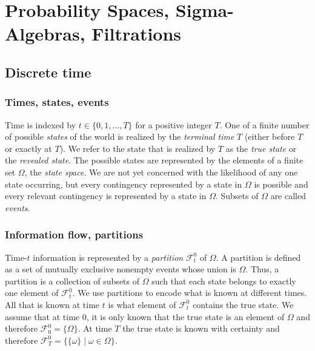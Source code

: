 \documentclass[\topdir/lecture\_notes.tex]{subfiles}
\begin{document}
\section{Probability Spaces, Sigma-Algebras, Filtrations}
\subsection{Discrete time}
\subsubsection*{Times, states, events}
Time is indexed by $t \in \{0,1, \ldots, T\}$ for a positive integer $T$. One of a finite number of possible \emph{states} of the world is realized by the \emph{terminal time} $T$ (either before $T$ or exactly at $T$). We refer to the state that is realized by $T$ as the \emph{true state} or the \emph{revealed state}. The possible states are represented by the elements of a finite set $\Omega$, the \emph{state space}. We are not yet concerned with the likelihood of any one state occurring, but every contingency represented by a state in $\Omega$ is possible and every relevant contingency is represented by a state in $\Omega$. Subsets of $\Omega$ are called \emph{events}.
\subsubsection*{Information flow, partitions}
Time-$t$ information is represented by a \emph{partition} $\mathcal{F}_{t}^{0}$ of $\Omega$. A partition is defined as a set of mutually exclusive nonempty events whose union is $\Omega$. Thus, a partition is a collection of subsets of $\Omega$ such that each state belongs to exactly one element of $\mathcal{F}_{t}^{0}$. We use partitions to encode what is known at different times. All that is known at time $t$ is what element of $\mathcal{F}_{t}^{0}$ contains the true state. We assume that at time $0$, it is only known that the true state is an element of $\Omega$ and therefore $\mathcal{F}_{0}^{0}=\{\Omega\}$. At time $T$ the true state is known with certainty and therefore $\mathcal{F}_{T}^{0}=\{\{\omega\} \mid \omega \in \Omega\}$.
\end{document}
